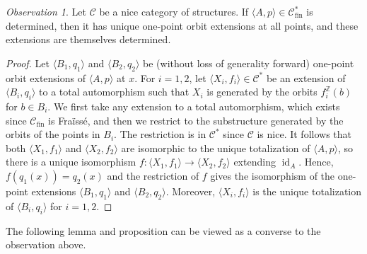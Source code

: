 \documentclass[oneside,notitlepage,12pt]{article}
\theoremstyle{definition}
\theoremstyle{remark}
\newtheorem{observation}[tw]{Observation}
\newcommand \seq [1]{\langle #1 \rangle}
\newcommand \maps {\colon} %
\newcommand \id [1]{{\operatorname{id}_{#1}}}
\newcommand \Z {\mathbb{Z}}
\newcommand \C {\mathscr{C}}
\newcommand \fin {{\operatorname{fin}}}
\begin{document}
\begin{observation} \label{thm:determined_to_pointwise}
    Let $\C$ be a nice category of structures.
    If $\seq{A, p} \in \C^*_\fin$ is determined, then it has unique one-point orbit extensions at all points, and these extensions are themselves determined.
\end{observation}
\begin{proof}
    Let $\seq{B_1, q_1}$ and $\seq{B_2, q_2}$ be (without loss of generality forward) one-point orbit extensions of $\seq{A, p}$ at $x$.
    For $i = 1, 2$, let $\seq{X_i, f_i} \in \C^*$  be an extension of $\seq{B_i, q_i}$ to a total automorphism such that $X_i$ is generated by the orbits $f_i^\Z(b)$ for $b \in B_i$.
    We first take any extension to a total automorphism, which exists since $\C_\fin$ is Fraïssé, and then we restrict to the substructure generated by the orbits of the points in $B_i$.
    The restriction is in $\C^*$ since $\C$ is nice.
    It follows that both $\seq{X_1, f_1}$ and $\seq{X_2, f_2}$ are isomorphic to the unique totalization of $\seq{A, p}$, so there is a unique isomorphism $f\maps \seq{X_1, f_1} \to \seq{X_2, f_2}$ extending $\id{A}$.
    Hence, $f(q_1(x)) = q_2(x)$ and the restriction of $f$ gives the isomorphism of the one-point extensions $\seq{B_1, q_1}$ and $\seq{B_2, q_2}$.
    Moreover, $\seq{X_i, f_i}$ is the unique totalization of $\seq{B_i, q_i}$ for $i = 1, 2$.
\end{proof}

The following lemma and proposition can be viewed as a converse to the observation above.
\end{document}
